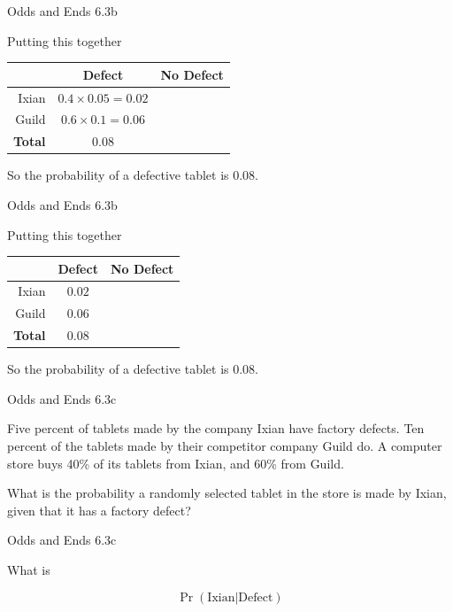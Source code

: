 \documentclass[
  ignorenonframetext,
]{beamer}
\renewcommand{\,}{\text{, }}
\begin{document}
\begin{frame}{Odds and Ends 6.3b}
\protect\hypertarget{odds-and-ends-6.3b-4}{}

Putting this together

\begin{longtable}[]{@{}rcc@{}}
\toprule
& Defect & No Defect\tabularnewline
\midrule
\endhead
Ixian & \(0.4 \times 0.05 = 0.02\) &\tabularnewline
Guild & \(0.6 \times 0.1 = 0.06\) &\tabularnewline
\textbf{Total} & \(0.08\) &\tabularnewline
\bottomrule
\end{longtable}

So the probability of a defective tablet is 0.08.

\end{frame}

\begin{frame}{Odds and Ends 6.3b}
\protect\hypertarget{odds-and-ends-6.3b-5}{}

Putting this together

\begin{longtable}[]{@{}rcc@{}}
\toprule
& Defect & No Defect\tabularnewline
\midrule
\endhead
Ixian & \(0.02\) &\tabularnewline
Guild & \(0.06\) &\tabularnewline
\textbf{Total} & \(0.08\) &\tabularnewline
\bottomrule
\end{longtable}

So the probability of a defective tablet is 0.08.

\end{frame}

\begin{frame}{Odds and Ends 6.3c}
\protect\hypertarget{odds-and-ends-6.3c}{}

Five percent of tablets made by the company Ixian have factory defects.
Ten percent of the tablets made by their competitor company Guild do. A
computer store buys 40\% of its tablets from Ixian, and 60\% from Guild.

What is the probability a randomly selected tablet in the store is made
by Ixian, given that it has a factory defect?

\end{frame}

\begin{frame}{Odds and Ends 6.3c}
\protect\hypertarget{odds-and-ends-6.3c-1}{}

What is

\[
\Pr(\text{Ixian} | \text{Defect})
\]

\end{frame}
\end{document}
